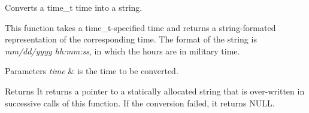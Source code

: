 Converts a time\+\_\+t time into a string. 

This function takes a time\+\_\+t-\/specified time and returns a string-\/formated representation of the corresponding time. The format of the string is {\itshape mm/dd/yyyy hh\+:mm\+:ss}, in which the hours are in military time.


\begin{DoxyParams}{Parameters}
{\em time} & is the time to be converted. \\
\hline
\end{DoxyParams}
\begin{DoxyReturn}{Returns}
It returns a pointer to a statically allocated string that is over-\/written in successive calls of this function. If the conversion failed, it returns N\+U\+LL. 
\end{DoxyReturn}
